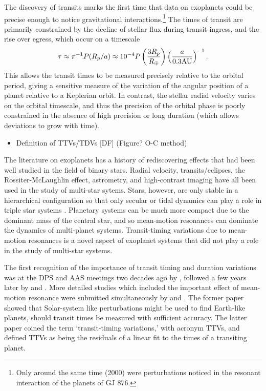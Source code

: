 \documentclass[graybox,natbib,nosecnum]{svmult}
\begin{document}
The discovery of transits marks the first time that data on exoplanets could be precise enough to notice gravitational interactions.\footnote{Only around the same time (2000) were perturbations noticed in the resonant interaction of the planets of GJ 876.}  The times of transit are primarily constrained by the decline of stellar flux during transit ingress, and the rise over egress, which occur on a timescale 
\begin{equation}
\tau \approx \pi^{-1} P(R_p/a) \approx 10^{-4}P \left(\frac{3 R_p}{R_\oplus}\right) \left(\frac{a}{0.3 \rm{AU}}\right)^{-1}.
\end{equation}  
This allows the transit times to be measured precisely relative to the orbital period, giving a sensitive measure of the variation of the angular position of a planet relative to a Keplerian orbit.  In contrast, the stellar radial velocity varies on the orbital timescale, and thus the precision of the orbital phase is poorly constrained in the absence of high precision or long duration (which allows deviations to grow with time).

\begin{itemize}
\item Definition of TTVs/TDVs [DF] (Figure? O-C method)
     \citep{2005Sci...307.1288H,2010Sci...330...51H}
\end{itemize}

The literature on exoplanets has a history of rediscovering effects that had been well studied in the field of binary stars.  Radial velocity, transits/eclipses, the Rossiter-McLaughlin effect, astrometry, and high-contrast imaging have all been used in the study of multi-star sytems.  Stars, however, are only stable in a hierarchical configuration so that only secular or tidal dynamics can play a role in triple star systems \citep{2003A&A...398.1091B}.  Planetary systems can be much more compact due to the dominant mass of the central star, and so mean-motion resonances can dominate the dynamics of multi-planet systems.  Transit-timing variations due to mean-motion resonances is a novel aspect of exoplanet systems that did not play a role in the study of multi-star systems.  

The first recognition of the importance of transit timing and duration variations was at the DPS and AAS meetings two decades ago by \citet{1996DPS....28.1208D,1996BAAS...28.1112D}, followed a few years later by \citet{2002ApJ...564.1019M} and \citet{Schneider2003,Schneider2004}.  More detailed studies which included the important effect of mean-motion resonance were submitted simultaneously by \citet{2005Sci...307.1288H} and \citet{2005MNRAS.359..567A}.  The former paper showed that Solar-system like perturbations might be used to find Earth-like planets, should transit times be measured with sufficient accuracy.  The latter paper coined the term `transit-timing variations,' with acronym TTVs, and defined TTVs as being the residuals of a linear fit to the times of a transiting planet.
\end{document}
